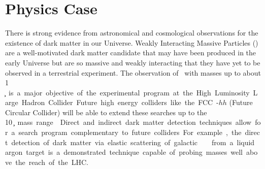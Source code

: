 \section{Physics Case}
\label{sec:PhysicsCase}



\vspace{1cm}

There is strong evidence from astronomical and cosmological observations for the existence of dark matter in our Universe. Weakly Interacting Massive Particles (\WIMPs) are a well-motivated dark matter candidate that may have been produced in the early Universe but are so massive and weakly interacting that they have yet to be observed in a terrestrial experiment. The observation of \WIMPs\ with masses up to about 1 \si{\TeV\per\square\c} is a major objective of the experimental program at the High Luminosity Large Hadron Collider. Future high energy colliders like the FCC-$hh$ (Future Circular Collider) will be able to extend these searches up to the  \SI{10}{\TeV\per\square\c} mass range~\cite{CERN:2017cq}. Direct and indirect dark matter detection techniques allow for a search program complementary to future colliders. For example, the direct detection of dark matter via elastic scattering of galactic \WIMPs\ from a liquid argon target is a demonstrated technique capable of probing masses well above the reach of the LHC.

